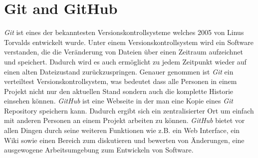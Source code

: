 \section{Git and GitHub}
\textit{Git} ist eines der bekanntesten Versionskontrollsysteme welches 2005 von Linus Torvalds entwickelt wurde. Unter einem Versionskontrollsystem wird ein Software verstanden, die die Veränderung von Dateien über einen Zeitraum aufzeichnet und speichert. Dadurch wird es auch ermöglicht zu jedem Zeitpunkt wieder auf einen alten Dateizustand zurückzuspringen.
Genauer genommen ist \textit{Git} ein verteiltest Versionskontrollsystem, was bedeutet dass alle Personen in einem  Projekt nicht nur den aktuellen Stand sondern auch die komplette Historie einsehen können. \autocite{preissel_stachmann_2017}
\newline
\newline
\textit{GitHub} ist eine Webseite in der man eine Kopie eines \textit{Git} Repository speichern kann. Dadurch ergibt sich ein zentralisierter Ort um einfach mit anderen Personen an einem Projekt  arbeiten zu können. \textit{GitHub} bietet vor allen Dingen durch seine weiteren Funktionen wie z.B. ein Web Interface, ein Wiki sowie einen Bereich zum diskutieren und bewerten von Änderungen, eine ausgewogene Arbeitsumgebung zum Entwickeln von Software. \autocite{bell_2014}